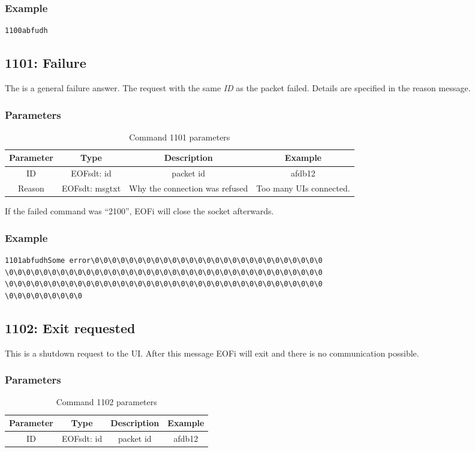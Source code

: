 \subsubsection{Example}
\begin{verbatim}
1100abfudh
\end{verbatim}
\subsection{1101: Failure}
The is a general failure answer. The request with the
same \emph{ID} as the packet failed.
Details are specified in the reason message.
\subsubsection{Parameters}
\begin{longtable}{|c|c|c|c|}
\caption{Command 1101 parameters}\\
\hline
\textbf{Parameter} & \textbf{Type} & \textbf{Description} & \textbf{Example}\\
\hline
ID & EOFsdt: id & packet id & afdb12\\
\hline
Reason & EOFsdt: msgtxt & Why the connection was refused & Too many UIs connected.\\
\hline
\end{longtable}
If the failed command was "`2100"', EOFi will close the socket afterwards.
\subsubsection{Example}
\begin{verbatim}
1101abfudhSome error\0\0\0\0\0\0\0\0\0\0\0\0\0\0\0\0\0\0\0\0\0\0\0\0\0\0\0
\0\0\0\0\0\0\0\0\0\0\0\0\0\0\0\0\0\0\0\0\0\0\0\0\0\0\0\0\0\0\0\0\0\0\0\0\0
\0\0\0\0\0\0\0\0\0\0\0\0\0\0\0\0\0\0\0\0\0\0\0\0\0\0\0\0\0\0\0\0\0\0\0\0\0
\0\0\0\0\0\0\0\0\0
\end{verbatim}
\subsection{1102: Exit requested}
This is a  shutdown request to the UI.
After this message EOFi will exit and there is no communication possible.
\subsubsection{Parameters}
\begin{longtable}{|c|c|c|c|}
\caption{Command 1102 parameters}\\
\hline
\textbf{Parameter} & \textbf{Type} & \textbf{Description} & \textbf{Example}\\
\hline
ID & EOFsdt: id & packet id & afdb12\\
\hline
\end{longtable}
